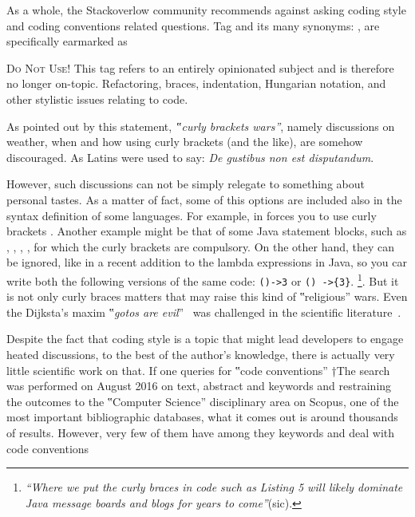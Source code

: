 As a whole, the Stackoverlow community
recommends against asking coding style and coding conventions related questions.
Tag  and its many synonyms: ,
 are specifically
earmarked as

\begin{tcolorbox}[colback=green!5!white,colframe=blue!25!white,notitle]
    \textsc{Do Not Use!}
This tag refers to an entirely opinionated subject and is therefore
no longer on-topic. Refactoring, braces, indentation, Hungarian notation, and
other stylistic issues relating to code.
\end{tcolorbox}

As pointed out by this statement, \emph{‟curly brackets wars”}, namely discussions
on weather, when and how using curly brackets (and the like), are somehow discouraged.
As Latins were used to say: \emph{De gustibus non est disputandum}.

However, such discussions can not be simply relegate to something about personal
tastes. 
As a matter of fact, some of this options are included also in the syntax definition of some languages.
For example, in \Go forces you to use curly brackets .
Another example might be that of some Java statement blocks, such as , , ,
, for which the curly brackets are compulsory.
On the other hand, they can be ignored, like in a recent addition to
the lambda expressions 
in Java, so you car write both the following versions of the same code: \texttt{()->3} or \texttt{() ->\{3\}}.
\footnote{
\emph{``Where we put the curly braces in code such as Listing 5 will likely dominate Java message boards and blogs for years to come''}(sic).
}.
But it is not only curly braces matters that may raise
this kind of ‟religious” wars. Even the Dijksta's maxim ‟\emph{gotos are evil}”~\cite{Dijkstra:68} 
was challenged in the scientific literature~\cite{Knuth:74,Ramshaw:88,Bochmann:73,Sennesh:Gil:16,Zoethout:79,Wulf:79,Clark:84}.

Despite the fact that coding style is a topic that might lead developers to
engage heated discussions, to the best of the author's knowledge, there is
actually very little scientific work on that.
If one queries for ‟code conventions” †{The search was
performed on August 2016 on text, abstract and keywords and
restraining the outcomes to the ‟Computer Science” disciplinary area} on
Scopus, one of the most important bibliographic
databases, what it comes out is around thousands of results. However, very few of them have  among they keywords and deal with code conventions

